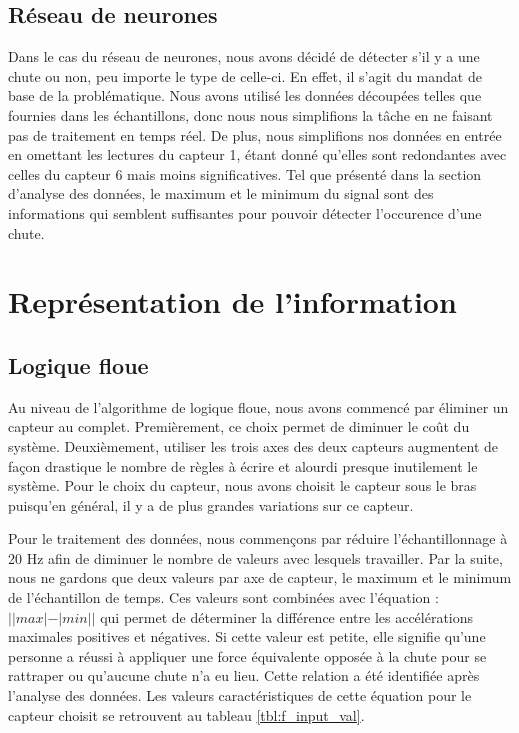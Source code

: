\documentclass[12pt,letterpaper]{article}
\begin{document}
\subsection{Réseau de neurones} %
Dans le cas du réseau de neurones, nous avons décidé de détecter s'il y a une chute ou non, peu importe le type de celle-ci. En effet, il s'agit du mandat de base de la problématique. Nous avons utilisé les données découpées telles que fournies dans les échantillons, donc nous nous simplifions la tâche en ne faisant pas de traitement en temps réel. De plus, nous simplifions nos données en entrée en omettant les lectures du capteur 1, étant donné qu'elles sont redondantes avec celles du capteur 6 mais moins significatives. Tel que présenté dans la section d'analyse des données, le maximum et le minimum du signal sont des informations qui semblent suffisantes pour pouvoir détecter l'occurence d'une chute.

\section{Représentation de l'information}

\subsection{Logique floue}

Au niveau de l'algorithme de logique floue, nous avons commencé par éliminer un capteur au complet. Premièrement, ce choix permet de diminuer le coût du système. Deuxièmement, utiliser les trois axes des deux capteurs augmentent de façon drastique le nombre de règles à écrire et alourdi presque inutilement le système. Pour le choix du capteur, nous avons choisit le capteur sous le bras puisqu'en général, il y a de plus grandes variations sur ce capteur.

Pour le traitement des données, nous commençons par réduire l'échantillonnage à 20 Hz afin de diminuer le nombre de valeurs avec lesquels travailler. Par la suite, nous ne gardons que deux valeurs par axe de capteur, le maximum et le minimum de l'échantillon de temps. Ces valeurs sont combinées avec l'équation : $||max|-|min||$ qui permet de déterminer la différence entre les accélérations maximales positives et négatives. Si cette valeur est petite, elle signifie qu'une personne a réussi à appliquer une force équivalente opposée à la chute pour se rattraper ou qu'aucune chute n'a eu lieu. Cette relation a été identifiée après l'analyse des données. Les valeurs caractéristiques de cette équation pour le capteur choisit se retrouvent au tableau \ref{tbl:f_input_val}.
\end{document}
